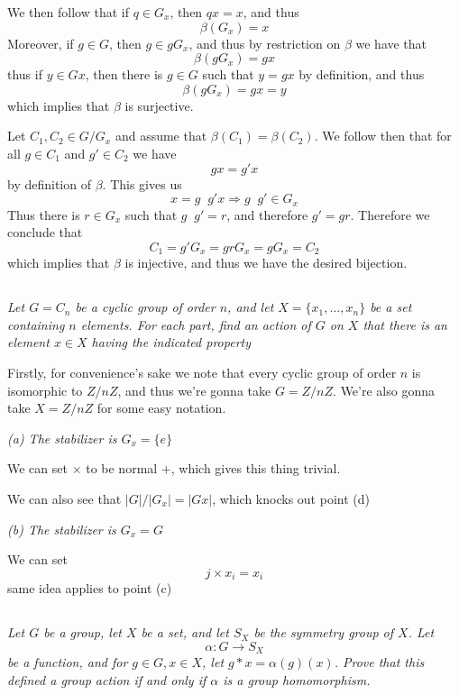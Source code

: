 \documentclass[11pt,oneside,titlepage]{book}
\DeclareMathOperator \inv {^{-1}}
\DeclareMathOperator \ra {\Rightarrow}
\newcommand{\set}[1]{\{ #1 \}}
\begin{document}
We then follow that if $q \in G_x$, then $qx = x$, and thus
$$\beta(G_x) = x$$
Moreover, if $g \in G$, then $g \in gG_x$, and thus by restriction on $\beta$
we have that
$$\beta(gG_x) = gx$$
thus if $y \in Gx$, then there is $g \in G$ such that $y = gx$ by definition,
and thus
$$\beta(gG_x) = gx = y$$
which implies that $\beta$ is surjective.

Let  $C_1, C_2 \in G/G_x$ and assume that $\beta(C_1) = \beta(C_2)$.
We follow then that for all $g \in C_1$ and $g' \in C_2$ we have
$$gx = g'x$$
by definition of $\beta$. This gives us
$$x = g\inv g'x \ra g\inv g' \in G_x$$
Thus there is $r \in G_x$ such that $g\inv g' = r$, and therefore
$g' = gr$. Therefore we conclude that
$$C_1 = g'G_x = gr G_x = g G_x = C_2$$
which implies that $\beta$ is injective, and thus we have the desired
bijection.

\subsection{}

\textit{Let $G = C_n$ be a cyclic group of order $n$, and let $X =
\set{x_1, ..., x_n}$ be a set containing $n$ elements. For each part,
find an action of $G$ on $X$ that there is an element $x \in X$ having
the indicated property}

Firstly, for convenience's sake we note that every cyclic group of
order $n$ is isomorphic to $Z/nZ$, and thus we're gonna take
$G = Z/nZ$. We're also gonna take $X = Z/nZ$ for some easy notation.

\textit{(a) The stabilizer is $G_x = \set{e}$}

We can set $\times$ to be normal $+$, which gives this thing trivial.

We can also see that $|G| / |G_x| = |Gx|$, which knocks out point (d)

\textit{(b) The stabilizer is $G_x = G$}

We can set
$$j \times x_i = x_i$$
same idea applies to point (c)

\subsection{}

\textit{Let $G$ be a group, let $X$ be a set, and let $S_X$ be the
  symmetry group of $X$. Let
  $$\alpha: G \to S_X$$
  be a function, and for $g \in G, x \in X$, let $g * x = \alpha
  (g)(x)$. Prove that this defined a group action if and only if $\alpha$
  is a group homomorphism.}
\end{document}
